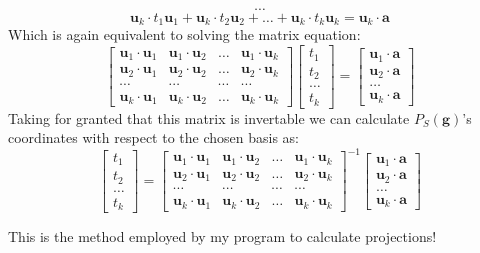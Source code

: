 \documentclass[12pt,leqno]{amsart}
\begin{document}
$$ \cdots $$
$$ \mathbf{u}_k \cdot t_1\mathbf{u}_{1} + \mathbf{u}_k \cdot t_2\mathbf{u}_{2} + \dots + \mathbf{u}_k \cdot t_k\mathbf{u}_{k} = \mathbf{u}_k \cdot \mathbf{a} $$
Which is again equivalent to solving the matrix equation:
$$ \begin{bmatrix}
	\mathbf{u}_1 \cdot \mathbf{u}_1  & \mathbf{u}_1 \cdot \mathbf{u}_2 & \dots & \mathbf{u}_1 \cdot \mathbf{u}_k \\
	\mathbf{u}_2 \cdot \mathbf{u}_1  & \mathbf{u}_2 \cdot \mathbf{u}_2 & \dots & \mathbf{u}_2 \cdot \mathbf{u}_k \\
	\cdots & \cdots & \cdots & \cdots \\
	\mathbf{u}_k \cdot \mathbf{u}_1 & \mathbf{u}_k \cdot \mathbf{u}_2 & \dots & \mathbf{u}_k \cdot \mathbf{u}_k 
	\end{bmatrix}
	\begin{bmatrix}
	t_1 \\
	t_2 \\
	\dots \\
	t_k
	\end{bmatrix}	
	= 
	\begin{bmatrix}
	\mathbf{u}_1 \cdot \mathbf{a} \\
	\mathbf{u}_2 \cdot \mathbf{a} \\
	\dots \\
	\mathbf{u}_k \cdot \mathbf{a}
	\end{bmatrix}
 $$
Taking for granted that this matrix is invertable we can calculate $P_S(\mathbf{g})$'s coordinates with respect to the chosen basis as:
$$ \begin{bmatrix}
	t_1 \\
	t_2 \\
	\dots \\
	t_k
	\end{bmatrix}	
	= 
	\begin{bmatrix}
	\mathbf{u}_1 \cdot \mathbf{u}_1  & \mathbf{u}_1 \cdot \mathbf{u}_2 & \dots & \mathbf{u}_1 \cdot \mathbf{u}_k \\
	\mathbf{u}_2 \cdot \mathbf{u}_1  & \mathbf{u}_2 \cdot \mathbf{u}_2 & \dots & \mathbf{u}_2 \cdot \mathbf{u}_k \\
	\cdots & \cdots & \cdots & \cdots \\
	\mathbf{u}_k \cdot \mathbf{u}_1 & \mathbf{u}_k \cdot \mathbf{u}_2 & \dots & \mathbf{u}_k \cdot \mathbf{u}_k 
	\end{bmatrix} ^{-1}
	\begin{bmatrix}
	\mathbf{u}_1 \cdot \mathbf{a} \\
	\mathbf{u}_2 \cdot \mathbf{a} \\
	\dots \\
	\mathbf{u}_k \cdot \mathbf{a}
	\end{bmatrix}
$$ 

\noindent This is the method employed by my program to calculate projections!
\end{document}
